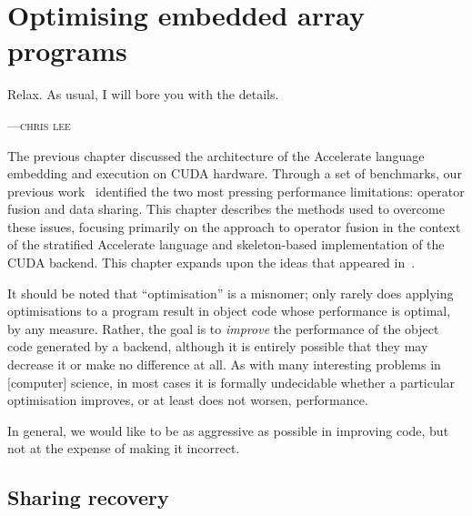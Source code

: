 
\chapter{Optimising embedded array programs}
\label{ch:optimising}

\epigraph{Relax. As usual, I will bore you with the details.}%
{\textsc{---chris lee}}

The previous chapter discussed the architecture of the Accelerate language
embedding and execution on CUDA hardware. Through a set of benchmarks, our
previous work~\cite{Chakravarty:2011fr} identified the two most pressing
performance limitations: operator fusion and data sharing. This chapter
describes the methods used to overcome these issues, focusing primarily on the
approach to operator fusion in the context of the stratified Accelerate language
and skeleton-based implementation of the CUDA backend. This chapter expands upon
the ideas that appeared in~\cite{McDonell:2013wi}.

It should be noted that ``optimisation'' is a misnomer; only rarely does
applying optimisations to a program result in object code whose performance is
optimal, by any measure. Rather, the goal is to \emph{improve} the performance
of the object code generated by a backend, although it is entirely possible that
they may decrease it or make no difference at all. As with many interesting
problems in [computer] science, in most cases it is formally undecidable whether
a particular optimisation improves, or at least does not worsen, performance.

In general, we would like to be as aggressive as possible in improving code, but
not at the expense of making it incorrect.


%

\section{Sharing recovery}
\label{sec:sharing_recovery}

